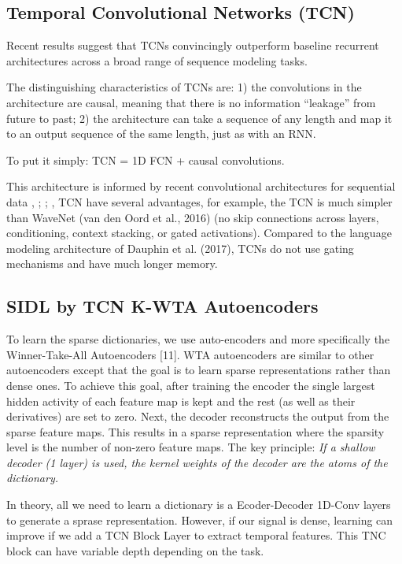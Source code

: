 \documentclass[11pt,a4paper]{article}
\begin{document}
\subsection{Temporal Convolutional Networks (TCN) }

Recent results suggest that TCNs convincingly outperform
baseline recurrent architectures across a broad range of sequence modeling tasks.

The distinguishing characteristics of TCNs are: 1)
the convolutions in the architecture are causal, meaning that
there is no information “leakage” from future to past; 2) the
architecture can take a sequence of any length and map it to
an output sequence of the same length, just as with an RNN.

To put it simply: TCN = 1D FCN + causal convolutions.

This architecture is informed by recent convolutional architectures for sequential data \cite{oord2016wavenet},
\cite{kalchbrenner2017neural} ; \cite{DBLP:journals/corr/DauphinFAG16}; \cite{Zheng2016}, TCN have several advantages, for example,
the TCN is much simpler than WaveNet (van den Oord et al.,
2016) (no skip connections across layers, conditioning, context stacking, or gated activations).
Compared to the language modeling architecture of Dauphin
et al. (2017), TCNs do not use gating mechanisms and have
much longer memory. 



\subsection{SIDL by TCN K-WTA Autoencoders}
To learn the sparse dictionaries, we use auto-encoders and more specifically the Winner-Take-All Autoencoders [11]. WTA autoencoders are similar to other autoencoders except that the goal is to learn sparse representations rather than dense ones. To achieve this goal, after training the encoder the single largest hidden activity of each feature map is kept and the rest (as well as their derivatives) are set to zero. Next, the decoder reconstructs the output from the sparse feature maps. This results in a sparse representation where the sparsity level is the number of non-zero feature maps. The key principle: \emph{If a shallow decoder (1 layer) is used, the kernel weights of the decoder are the atoms of the dictionary.}

In theory, all we need to learn a dictionary is a Ecoder-Decoder 1D-Conv layers to generate a sprase representation. However, if our signal is dense, learning can improve if we add a TCN Block Layer to extract temporal features. This TNC block can have variable depth depending on the task.
\end{document}
